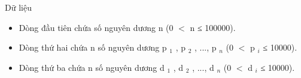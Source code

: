 Dữ liệu
\begin{itemize}
	\item     Dòng đầu tiên chứa số nguyên dương n (0 $<$ n ≤ 100000).   
	\item     Dòng thứ hai chứa n số nguyên dương p    $_     1    $    , p    $_     2    $    , ..., p    $_     n    $    (0 $<$ p    $_     i    $    ≤ 10000).   
	\item     Dòng thứ ba chứa n số nguyên dương d    $_     1    $    , d    $_     2    $    , ..., d    $_     n    $    (0 $<$ d    $_     i    $    ≤ 10000).   
\end{itemize}